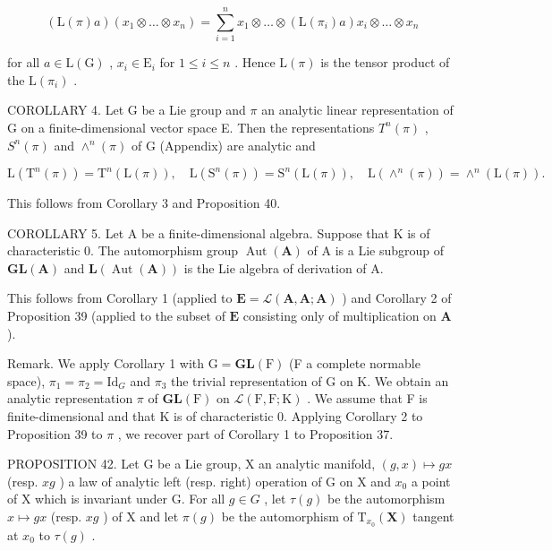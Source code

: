 \[
(\mathrm{L} (\pi) a) (x _ {1} \otimes \dots \otimes x _ {n}) = \sum_ {i = 1} ^ {n} x _ {1} \otimes \dots \otimes (\mathrm{L} (\pi_ {i}) a) x _ {i} \otimes \dots \otimes x _ {n}
\]

for all \(a \in \mathrm{L}(\mathrm{G})\) , \(x_{i} \in \mathrm{E}_{i}\) for \(1 \leqslant i \leqslant n\) . Hence \(\mathrm{L}(\pi)\) is the tensor product of the \(\mathrm{L}(\pi_{i})\) .

COROLLARY 4. Let G be a Lie group and \(\pi\) an analytic linear representation of G on a finite-dimensional vector space E. Then the representations \(T^{n}(\pi)\) , \(S^{n}(\pi)\) and \(\wedge^{n}(\pi)\) of G (Appendix) are analytic and

\[
\mathrm{L} \left(\mathrm{T} ^ {n} (\pi)\right) = \mathrm{T} ^ {n} (\mathrm{L} (\pi)), \quad \mathrm{L} \left(\mathrm{S} ^ {n} (\pi)\right) = \mathrm{S} ^ {n} (\mathrm{L} (\pi)), \quad \mathrm{L} \left(\wedge^ {n} (\pi)\right) = \wedge^ {n} (\mathrm{L} (\pi)).
\]

This follows from Corollary 3 and Proposition 40.

COROLLARY 5. Let A be a finite-dimensional algebra. Suppose that K is of characteristic 0. The automorphism group \(\operatorname{Aut}(\mathbf{A})\) of A is a Lie subgroup of \(\mathbf{GL}(\mathbf{A})\) and \(\mathbf{L}(\operatorname{Aut}(\mathbf{A}))\) is the Lie algebra of derivation of A.

This follows from Corollary 1 (applied to \(\mathbf{E} = \mathcal{L}(\mathbf{A},\mathbf{A};\mathbf{A})\) ) and Corollary 2 of Proposition 39 (applied to the subset of \(\mathbf{E}\) consisting only of multiplication on \(\mathbf{A}\) ).

Remark. We apply Corollary 1 with \(\mathrm{G} = \mathbf{GL}(\mathrm{F})\) (F a complete normable space), \(\pi_1 = \pi_2 = \mathrm{Id}_{G}\) and \(\pi_3\) the trivial representation of G on K. We obtain an analytic representation \(\pi\) of \(\mathbf{GL}(\mathrm{F})\) on \(\mathcal{L}(\mathrm{F},\mathrm{F};\mathrm{K})\) . We assume that F is finite-dimensional and that K is of characteristic 0. Applying Corollary 2 to Proposition 39 to \(\pi\) , we recover part of Corollary 1 to Proposition 37.

PROPOSITION 42. Let G be a Lie group, X an analytic manifold, \((g,x)\mapsto gx\) (resp. \(xg\) ) a law of analytic left (resp. right) operation of G on X and \(x_0\) a point of X which is invariant under G. For all \(g\in G\) , let \(\tau (g)\) be the automorphism \(x\mapsto gx\) (resp. \(xg\) ) of X and let \(\pi (g)\) be the automorphism of \(\mathrm{T}_{x_0}(\mathbf{X})\) tangent at \(x_0\) to \(\tau (g)\) .

